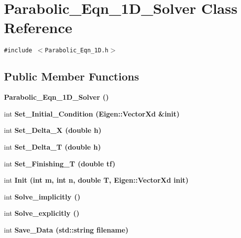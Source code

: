 \section{Parabolic\_\-Eqn\_\-1D\_\-Solver Class Reference}
\label{classParabolic__Eqn__1D__Solver}
{\tt \#include $<$Parabolic\_\-Eqn\_\-1D.h$>$}

\subsection*{Public Member Functions}
\begin{CompactItemize}
\item 
\bf{Parabolic\_\-Eqn\_\-1D\_\-Solver} ()
\item 
int \bf{Set\_\-Initial\_\-Condition} (Eigen::Vector\-Xd \&init)
\item 
int \bf{Set\_\-Delta\_\-X} (double h)
\item 
int \bf{Set\_\-Delta\_\-T} (double h)
\item 
int \bf{Set\_\-Finishing\_\-T} (double tf)
\item 
int \bf{Init} (int m, int n, double T, Eigen::Vector\-Xd init)
\item 
int \bf{Solve\_\-implicitly} ()
\item 
int \bf{Solve\_\-explicitly} ()
\item 
int \bf{Save\_\-Data} (std::string filename)
\end{CompactItemize}
